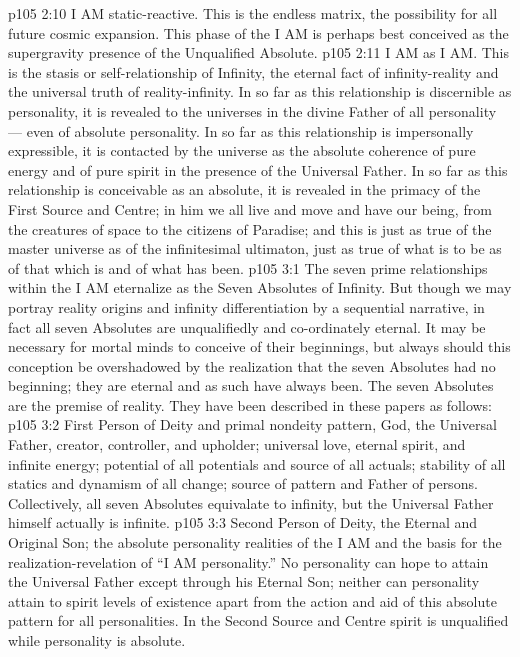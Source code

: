 \vs p105 2:10 \bibnobreakspace {} I AM static\hyp{}reactive. This is the endless matrix, the possibility for all future cosmic expansion. This phase of the I AM is perhaps best conceived as the supergravity presence of the Unqualified Absolute.
\vs p105 2:11 \bibnobreakspace {} I AM as I AM. This is the stasis or self\hyp{}relationship of Infinity, the eternal fact of infinity\hyp{}reality and the universal truth of reality\hyp{}infinity. In so far as this relationship is discernible as personality, it is revealed to the universes in the divine Father of all personality --- even of absolute personality. In so far as this relationship is impersonally expressible, it is contacted by the universe as the absolute coherence of pure energy and of pure spirit in the presence of the Universal Father. In so far as this relationship is conceivable as an absolute, it is revealed in the primacy of the First Source and Centre; in him we all live and move and have our being, from the creatures of space to the citizens of Paradise; and this is just as true of the master universe as of the infinitesimal ultimaton, just as true of what is to be as of that which is and of what has been.
\vs p105 3:1 The seven prime relationships within the I AM eternalize as the Seven Absolutes of Infinity. But though we may portray reality origins and infinity differentiation by a sequential narrative, in fact all seven Absolutes are unqualifiedly and co\hyp{}ordinately eternal. It may be necessary for mortal minds to conceive of their beginnings, but always should this conception be overshadowed by the realization that the seven Absolutes had no beginning; they are eternal and as such have always been. The seven Absolutes are the premise of reality. They have been described in these papers as follows:
\vs p105 3:2 \bibnobreakspace {} First Person of Deity and primal nondeity pattern, God, the Universal Father, creator, controller, and upholder; universal love, eternal spirit, and infinite energy; potential of all potentials and source of all actuals; stability of all statics and dynamism of all change; source of pattern and Father of persons. Collectively, all seven Absolutes equivalate to infinity, but the Universal Father himself actually is infinite.
\vs p105 3:3 \bibnobreakspace {} Second Person of Deity, the Eternal and Original Son; the absolute personality realities of the I AM and the basis for the realization\hyp{}revelation of “I AM personality.” No personality can hope to attain the Universal Father except through his Eternal Son; neither can personality attain to spirit levels of existence apart from the action and aid of this absolute pattern for all personalities. In the Second Source and Centre spirit is unqualified while personality is absolute.
